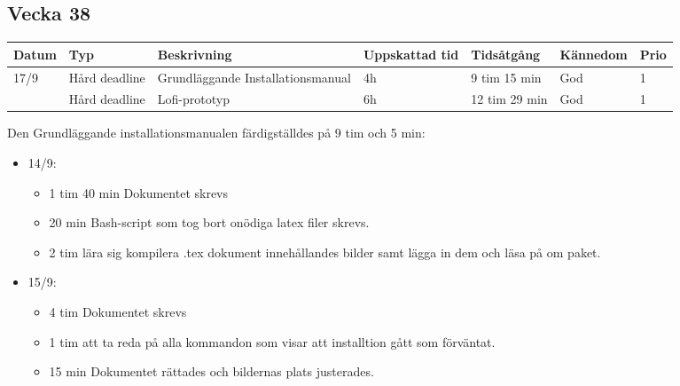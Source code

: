 \documentclass{TDP003mall}
\begin{document}
\newpage

\subsection{Vecka 38}
\begin{tabularx}{\linewidth}{|l|l|X|l|l|l|l|}
	\hline
	Datum & Typ           & Beskrivning                       & Uppskattad tid & Tidsåtgång    & Kännedom & Prio \\ [0.5ex]
	\hline                                                    
	17/9  & Hård deadline & Grundläggande Installationsmanual & 4h             & 9 tim 15 min  & God      & 1    \\
	\hline                                                    
          & Hård deadline & Lofi-prototyp                     & 6h             & 12 tim 29 min & God      & 1    \\
	\hline
\end{tabularx}

Den Grundläggande installationsmanualen färdigställdes på 9 tim och 5 min:
\begin{itemize}
	\item 14/9:
	\begin{itemize}
		\item 1 tim 40 min Dokumentet skrevs
		\item 20 min Bash-script som tog bort onödiga latex filer skrevs.
		\item 2 tim lära sig kompilera .tex dokument innehållandes bilder samt lägga in dem och läsa på om paket.
	\end{itemize}
	\item 15/9:
	\begin{itemize}
		\item 4 tim Dokumentet skrevs
		\item 1 tim att ta reda på alla kommandon som visar att installtion gått som förväntat.
		\item 15 min Dokumentet rättades och bildernas plats justerades.\\
	\end{itemize}
\end{itemize}
\end{document}
